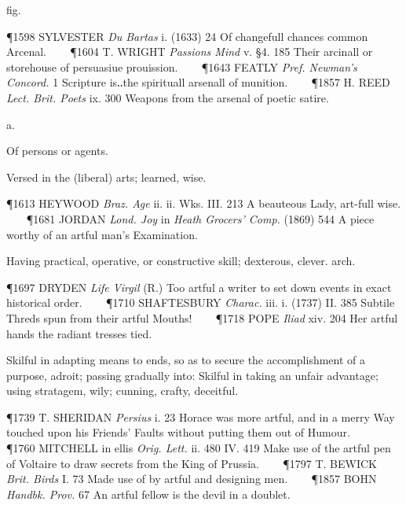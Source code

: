 \begin{description}[wide, labelwidth=!, labelindent=0pt]
\begin{myenumerate}
 fig.

\P 1598 SYLVESTER  \textit{Du Bartas} i. (1633) 24 Of changefull chances common Arcenal.    
\P 1604 T. WRIGHT  \textit{Passions Mind} v. §4. 185 Their arcinall or storehouse of persuasiue prouission.    
\P 1643 FEATLY  \textit{Pref. Newman's Concord.} 1 Scripture is‥the spirituall arsenall of munition.    
\P 1857 H. REED  \textit{Lect. Brit. Poets} ix. 300 Weapons from the arsenal of poetic satire.
\end{myenumerate}


 a.

\noindent {}

\vspace{-0.3cm}

\begin{myenumerate}

 Of persons or agents.

 Versed in the (liberal) arts; learned, wise.

\P 1613 HEYWOOD  \textit{Braz. Age} ii. ii. Wks. III. 213 A beauteous Lady, art-full wise.    
\P 1681 JORDAN  \textit{Lond. Joy} in \textit{Heath Grocers' Comp.} (1869) 544 A piece worthy of an artful man's Examination.

 Having practical, operative, or constructive skill; dexterous, clever. arch.

\P 1697 DRYDEN  \textit{Life Virgil} (R.) Too artful a writer to set down events in exact historical order.    
\P 1710 SHAFTESBURY  \textit{Charac.} iii. i. (1737) II. 385 Subtile Threds spun from their artful Mouths!    
\P 1718 POPE  \textit{Iliad} xiv. 204 Her artful hands the radiant tresses tied.

 Skilful in adapting means to ends, so as to secure the accomplishment of a purpose, adroit; passing gradually into: Skilful in taking an unfair advantage; using stratagem, wily; cunning, crafty, deceitful.

\P 1739 T. SHERIDAN  \textit{Persius} i. 23 Horace was more artful, and in a merry Way touched upon his Friends' Faults without putting them out of Humour.    
\P 1760 MITCHELL in ellis \textit{Orig. Lett.} ii. 480 IV. 419 Make use of the artful pen of Voltaire to draw secrets from the King of Prussia.    
\P 1797 T. BEWICK  \textit{Brit. Birds} I. 73 Made use of by artful and designing men.    
\P 1857 BOHN  \textit{Handbk. Prov.} 67 An artful fellow is the devil in a doublet.


\end{myenumerate}
\end{description}
